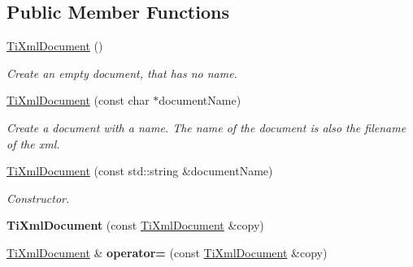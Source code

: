 \subsection*{Public Member Functions}
\begin{DoxyCompactItemize}
\item 
\hypertarget{class_ti_xml_document_a9f5e84335708fde98400230f9f12659c}{\hyperlink{class_ti_xml_document_a9f5e84335708fde98400230f9f12659c}{Ti\+Xml\+Document} ()}\label{class_ti_xml_document_a9f5e84335708fde98400230f9f12659c}

\begin{DoxyCompactList}\small\item\em Create an empty document, that has no name. \end{DoxyCompactList}\item 
\hypertarget{class_ti_xml_document_ae4508b452d0c3061db085f3db27b8396}{\hyperlink{class_ti_xml_document_ae4508b452d0c3061db085f3db27b8396}{Ti\+Xml\+Document} (const char $\ast$document\+Name)}\label{class_ti_xml_document_ae4508b452d0c3061db085f3db27b8396}

\begin{DoxyCompactList}\small\item\em Create a document with a name. The name of the document is also the filename of the xml. \end{DoxyCompactList}\item 
\hypertarget{class_ti_xml_document_a2c6e58fb99bfa76cc613f16840022225}{\hyperlink{class_ti_xml_document_a2c6e58fb99bfa76cc613f16840022225}{Ti\+Xml\+Document} (const std\+::string \&document\+Name)}\label{class_ti_xml_document_a2c6e58fb99bfa76cc613f16840022225}

\begin{DoxyCompactList}\small\item\em Constructor. \end{DoxyCompactList}\item 
\hypertarget{class_ti_xml_document_a323a7486e7da6099cdc19a5ff7e74b07}{{\bfseries Ti\+Xml\+Document} (const \hyperlink{class_ti_xml_document}{Ti\+Xml\+Document} \&copy)}\label{class_ti_xml_document_a323a7486e7da6099cdc19a5ff7e74b07}

\item 
\hypertarget{class_ti_xml_document_aa56fd4dbe8917d2033d865909e2d737e}{\hyperlink{class_ti_xml_document}{Ti\+Xml\+Document} \& {\bfseries operator=} (const \hyperlink{class_ti_xml_document}{Ti\+Xml\+Document} \&copy)}\label{class_ti_xml_document_aa56fd4dbe8917d2033d865909e2d737e}


\end{DoxyCompactItemize}
